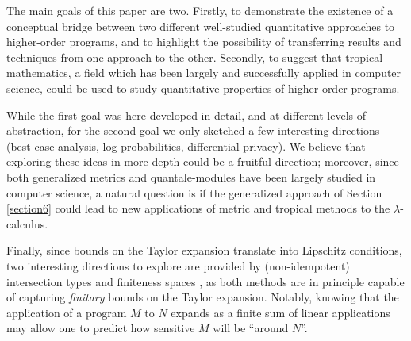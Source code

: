 


The main goals of this paper are two. Firstly,  to
demonstrate the existence of a conceptual bridge between two different well-studied quantitative approaches to higher-order programs, and to highlight the possibility of transferring results and techniques from one approach to the other. 
Secondly, to suggest that tropical mathematics, a
field which has been largely and successfully applied in computer science, could be used to study quantitative properties of higher-order programs.

While the first goal was here developed in detail, and at different levels of abstraction, for the second goal we only sketched a few interesting directions (best-case analysis, log-probabilities, differential privacy). We believe that exploring these ideas in more depth could be a fruitful direction; moreover, 
since both generalized metrics and quantale-modules have been largely studied in computer science, 
a natural question is if the generalized approach of Section \ref{section6} could  lead to new applications of metric and tropical methods to the $\lambda$-calculus.

Finally, since bounds on the Taylor expansion translate into Lipschitz conditions, 
 two interesting directions to explore are provided by (non-idempotent) intersection types and finiteness spaces \cite{Ehrhard2005}, as both methods are in principle capable of capturing \emph{finitary} bounds on the Taylor expansion. %
Notably, knowing that the application of a program $M$ to $N$ expands as a finite sum of linear applications may allow one to predict how sensitive $M$ will be ``around $N$''. 

\newpage